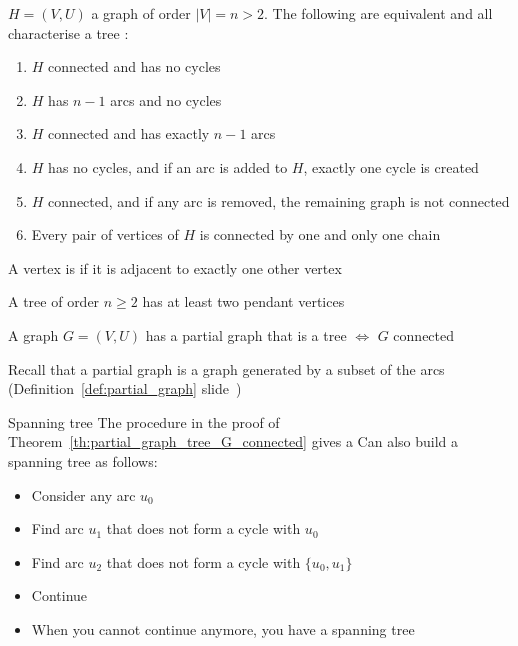 \documentclass[aspectratio=169]{beamer}\usepackage[]{graphicx}\usepackage[]{xcolor}
\begin{document}
\begin{frame}
\begin{theorem}\label{th:characterisation_tree}
$H=(V,U)$ a graph of order $|V|=n>2$. The following are equivalent and all characterise a tree :
\begin{enumerate}
\item $H$ connected and has no cycles
\item $H$ has $n-1$ arcs and no cycles
\item $H$ connected and has exactly $n-1$ arcs
\item $H$ has no cycles, and if an arc is added to $H$, exactly one cycle is created
\item $H$ connected, and if any arc is removed, the remaining graph is not
connected
\item Every pair of vertices of $H$ is connected by one and only one chain
\end{enumerate}
\end{theorem}
\end{frame}



\begin{frame}
\begin{definition}
A vertex is  if it is adjacent to exactly one other vertex
\end{definition}
\vfill
\begin{theorem}
A tree of order $n\geq 2$ has at least two pendant vertices
\end{theorem}
\end{frame}

\begin{frame}
\begin{theorem}\label{th:partial_graph_tree_G_connected}
A graph $G=(V,U)$ has a partial graph that is a tree $\iff$ $G$ connected
\end{theorem}
\vfill
Recall that a partial graph is a graph generated by a subset of the arcs (Definition~\ref{def:partial_graph} slide~\pageref{def:partial_graph})
\end{frame}

\begin{frame}{Spanning tree}
The procedure in the proof of Theorem~\ref{th:partial_graph_tree_G_connected} gives a 
\vfill
Can also build a spanning tree as follows:
\begin{itemize}
\item Consider any arc $u_0$
\item Find arc $u_1$ that does not form a cycle with $u_0$
\item Find arc $u_2$ that does not form a cycle with $\{u_0,u_1\}$
\item Continue
\item When you cannot continue anymore, you have a spanning tree
\end{itemize}
\end{frame}
\end{document}

